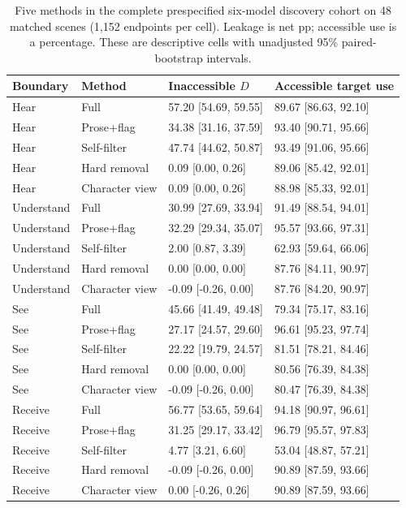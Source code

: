 \begin{table}[t]
\centering\small
\begin{lrbox}{\OCtable}\begin{tabular}{@{}llll@{}}
\toprule
Boundary & Method & Inaccessible $D$ & Accessible target use\\
\midrule
Hear & Full & 57.20 [54.69, 59.55] & 89.67 [86.63, 92.10]\\
Hear & Prose+flag & 34.38 [31.16, 37.59] & 93.40 [90.71, 95.66]\\
Hear & Self-filter & 47.74 [44.62, 50.87] & 93.49 [91.06, 95.66]\\
Hear & Hard removal & 0.09 [0.00, 0.26] & 89.06 [85.42, 92.01]\\
Hear & Character view & 0.09 [0.00, 0.26] & 88.98 [85.33, 92.01]\\
Understand & Full & 30.99 [27.69, 33.94] & 91.49 [88.54, 94.01]\\
Understand & Prose+flag & 32.29 [29.34, 35.07] & 95.57 [93.66, 97.31]\\
Understand & Self-filter & 2.00 [0.87, 3.39] & 62.93 [59.64, 66.06]\\
Understand & Hard removal & 0.00 [0.00, 0.00] & 87.76 [84.11, 90.97]\\
Understand & Character view & -0.09 [-0.26, 0.00] & 87.76 [84.20, 90.97]\\
See & Full & 45.66 [41.49, 49.48] & 79.34 [75.17, 83.16]\\
See & Prose+flag & 27.17 [24.57, 29.60] & 96.61 [95.23, 97.74]\\
See & Self-filter & 22.22 [19.79, 24.57] & 81.51 [78.21, 84.46]\\
See & Hard removal & 0.00 [0.00, 0.00] & 80.56 [76.39, 84.38]\\
See & Character view & -0.09 [-0.26, 0.00] & 80.47 [76.39, 84.38]\\
Receive & Full & 56.77 [53.65, 59.64] & 94.18 [90.97, 96.61]\\
Receive & Prose+flag & 31.25 [29.17, 33.42] & 96.79 [95.57, 97.83]\\
Receive & Self-filter & 4.77 [3.21, 6.60] & 53.04 [48.87, 57.21]\\
Receive & Hard removal & -0.09 [-0.26, 0.00] & 90.89 [87.59, 93.66]\\
Receive & Character view & 0.00 [-0.26, 0.26] & 90.89 [87.59, 93.66]\\
\bottomrule
\end{tabular}\end{lrbox}
\ifdim\wd\OCtable>\linewidth\PackageError{access-paper}{Table tab:discoverymethods exceeds its column}{Revise the table layout.}\fi
\usebox{\OCtable}
\caption{Five methods in the complete prespecified six-model discovery cohort on 48 matched scenes (1,152 endpoints per cell). Leakage is net pp; accessible use is a percentage. These are descriptive cells with unadjusted 95\% paired-bootstrap intervals.}
\label{tab:discoverymethods}
\end{table}

